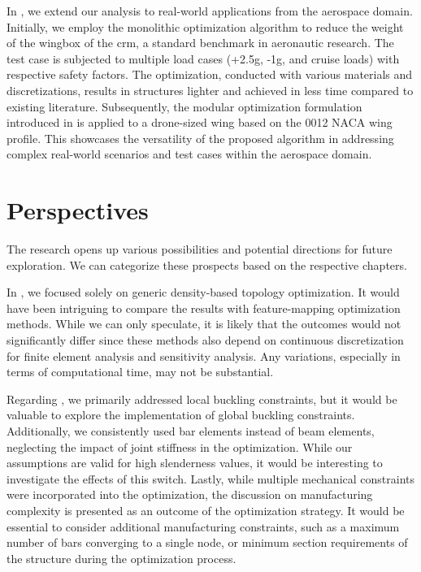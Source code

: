 In , we extend our analysis to real-world applications from the aerospace domain. Initially, we employ the monolithic optimization algorithm to reduce the weight of the wingbox of the \gls{crm}, a standard benchmark in aeronautic research. The test case is subjected to multiple load cases (+2.5g, -1g, and cruise loads) with respective safety factors. The optimization, conducted with various materials and discretizations, results in structures lighter and achieved in less time compared to existing literature. Subsequently, the modular optimization formulation introduced in  is applied to a drone-sized wing based on the 0012 NACA wing profile. This showcases the versatility of the proposed algorithm in addressing complex real-world scenarios and test cases within the aerospace domain.

\section*{Perspectives}
The research opens up various possibilities and potential directions for future exploration. We can categorize these prospects based on the respective chapters.

In , we focused solely on generic density-based topology optimization. It would have been intriguing to compare the results with feature-mapping optimization methods. While we can only speculate, it is likely that the outcomes would not significantly differ since these methods also depend on continuous discretization for finite element analysis and sensitivity analysis. Any variations, especially in terms of computational time, may not be substantial.

Regarding , we primarily addressed local buckling constraints, but it would be valuable to explore the implementation of global buckling constraints. Additionally, we consistently used bar elements instead of beam elements, neglecting the impact of joint stiffness in the optimization. While our assumptions are valid for high slenderness values, it would be interesting to investigate the effects of this switch. Lastly, while multiple mechanical constraints were incorporated into the optimization, the discussion on manufacturing complexity is presented as an outcome of the optimization strategy. It would be essential to consider additional manufacturing constraints, such as a maximum number of bars converging to a single node, or minimum section requirements of the structure during the optimization process. 

